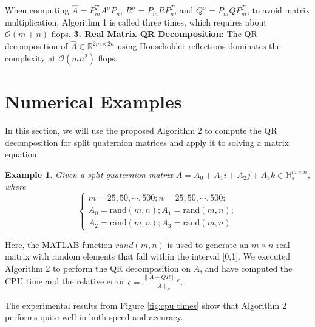 \documentclass[12pt]{article}
\newtheorem{example}[theorem]{Example}
\numberwithin{equation}{section} %
\begin{document}
When computing \(\hat{A} = P_m^T A^\sigma P_n\), \(R^\sigma = P_{m}RP_{n}^T\), and \(Q^\sigma = P_{m}QP_{m}^T\), to avoid matrix multiplication, Algorithm 1 is called three times, which requires about \(\mathcal{O}(m+n)\) flops.
\textbf{3. Real Matrix QR Decomposition:}
The QR decomposition of \(\hat{A} \in \mathbb{R}^{2m \times 2n}\) using Householder reflections dominates the complexity at \(\mathcal{O}(mn^2)\) flops.
\fi

\section{\textbf{Numerical Examples}}
In this section,  we will use the proposed  Algorithm 2 to compute the QR decomposition for split quaternion matrices and apply it to solving a matrix equation.
\begin{example}
    Given a split quaternion matrix $A = A_{0}+A_{1}i+A_{2}j+A_{3}k\in \mathbb{H}_s^{m\times n}$, where
    \begin{equation}
       \begin{cases}
            m = 25,50,\cdots,500;
            n = 25,50,\cdots,500;  \\
            A_{0}=\text{rand}(m,n);
            A_{1}=\text{rand}(m,n); \\
            A_{2}=\text{rand}(m,n);
            A_{3}=\text{rand}(m,n).
        \end{cases} \label{eq:example2}
    \end{equation}
\end{example}
Here, the MATLAB function  $rand(m,n)$ is used to generate an $m \times n$ real matrix with random elements that fall within the interval [0,1]. We executed Algorithm 2 to perform the QR decomposition on $A$, and have computed the CPU time and the relative error
$\epsilon = \frac{\left\|A - Q R\right\|_{F}}{\|A\|_{F}}.$

The experimental results from Figure \ref{fig:cpu times} show that Algorithm 2 performs quite well in both speed and accuracy. 
\end{document}
